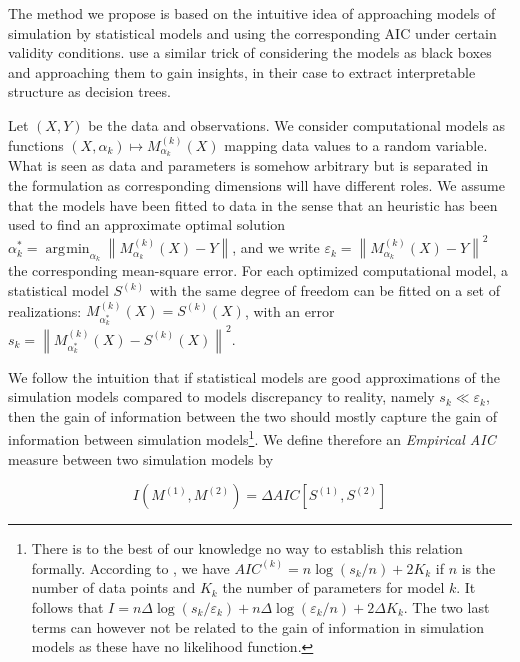 \documentclass[Royal,sageh,times]{sagej}
\newcommand{\norm}[1]{\left\lVert #1 \right\rVert}
\DeclareMathOperator*{\argmin}{\arg\!\min}
\begin{document}
The method we propose is based on the intuitive idea of approaching models of simulation by statistical models and using the corresponding AIC under certain validity conditions. \cite{2017arXiv170609773B} use a similar trick of considering the models as black boxes and approaching them to gain insights, in their case to extract interpretable structure as decision trees.

Let $(X,Y)$ be the data and observations. We consider computational models as functions $(X,\alpha_k) \mapsto M_{\alpha_k}^{(k)}(X)$ mapping data values to a random variable. What is seen as data and parameters is somehow arbitrary but is separated in the formulation as corresponding dimensions will have different roles. We assume that the models have been fitted to data in the sense that an heuristic has been used to find an approximate optimal solution $\alpha^{\ast}_k = \argmin_{\alpha_k}\norm{M_{\alpha_k}^{(k)}(X) - Y}$, and we write $\varepsilon_k = \norm{M_{\alpha_k}^{(k)}(X) - Y}^2$ the corresponding mean-square error. For each optimized computational model, a statistical model $S^{(k)}$ with the same degree of freedom can be fitted on a set of realizations: $M^{(k)}_{\alpha^{\ast}_k}(X) = S^{(k)} (X)$, with an error $s_k = \norm{M_{\alpha^{\ast}_k}^{(k)}(X) - S^{(k)}(X)}^2$.

We follow the intuition that if statistical models are good approximations of the simulation models compared to models discrepancy to reality, namely $s_k \ll \varepsilon_k$, then the gain of information between the two should mostly capture the gain of information between simulation models\footnote{There is to the best of our knowledge no way to establish this relation formally. According to \cite{navakatikyan2007model}, we have $AIC^{(k)} = n \log{\left(s_k/n\right)}+2K_k$ if $n$ is the number of data points and $K_k$ the number of parameters for model $k$. It follows that $I = n \Delta \log{\left(s_k/\varepsilon_k\right)} + n \Delta \log{\left(\varepsilon_k/n\right)} + 2 \Delta K_k$. The two last terms can however not be related to the gain of information in simulation models as these have no likelihood function.}. We define therefore an \emph{Empirical AIC} measure between two simulation models by

\begin{equation}
I\left( M^{(1)}, M^{(2)}\right) = \Delta AIC \left[S^{(1)},S^{(2)}\right]
\end{equation}
\end{document}
